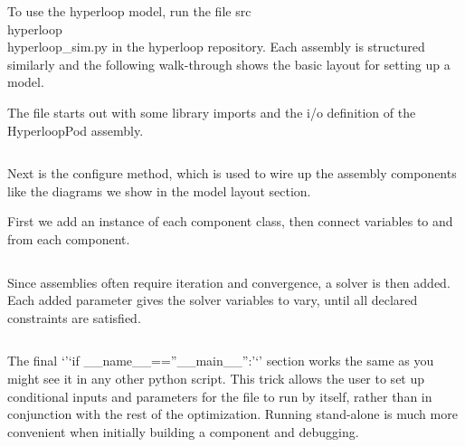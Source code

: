 \documentclass[heading.tex]{subfiles}
\begin{document}
To use the hyperloop model, run the file src\\hyperloop\\hyperloop\_sim.py in the hyperloop repository. 
Each assembly is structured similarly and the following walk-through shows the basic layout for setting up a model.

The file starts out with some library imports and the i/o definition of the HyperloopPod assembly.

\inputminted[fontsize=\tiny]{python}{code/example1.py}

Next is the configure method, which is used to wire up the assembly components like the diagrams we show in the model layout section.

First we add an instance of each component class, then connect variables to and from each component.

\inputminted[fontsize=\tiny]{python}{code/example2.py}
 
 Since assemblies often require iteration and convergence, a solver is then added. Each added parameter gives the solver variables to vary, until all declared constraints are satisfied.
\inputminted[fontsize=\tiny]{python}{code/example3.py}
The final ‘’‘if \_\_name\_\_==”\_\_main\_\_”:’‘’ section works the same as you might see it in any other python script. This trick allows the user to set up conditional inputs and parameters for the file to run by itself, rather than in conjunction with the rest of the optimization. Running stand-alone is much more convenient when initially building a component and debugging. 

\inputminted[fontsize=\tiny]{python}{code/example4.py} %
\end{document}
